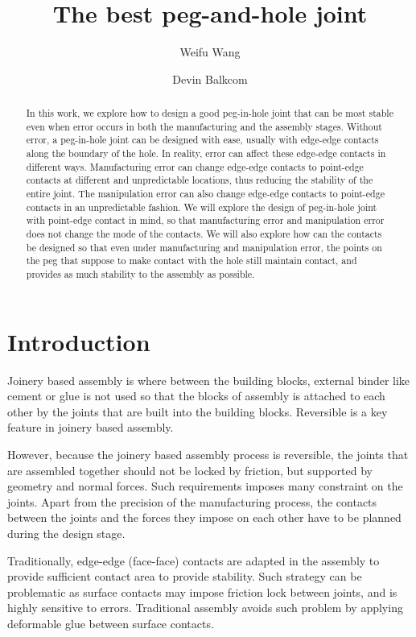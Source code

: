 \documentclass[11pt, twocolumn]{article}
\title{The best peg-and-hole joint}
\author{Weifu Wang \and Devin Balkcom}
\begin{document}
\maketitle

\begin{abstract}
In this work, we explore how to design a good peg-in-hole joint that can be most stable even when error occurs in both the manufacturing and the assembly stages. Without error, a peg-in-hole joint can be designed with ease, usually with edge-edge contacts along the boundary of the hole. In reality, error can affect these edge-edge contacts in different ways. Manufacturing error can change edge-edge contacts to point-edge contacts at different and unpredictable locations, thus reducing the stability of the entire joint. The manipulation error can also change edge-edge contacts to point-edge contacts in an unpredictable fashion. We will explore the design of peg-in-hole joint with point-edge contact in mind, so that manufacturing error and manipulation error does not change the mode of the contacts. We will also explore how can the contacts be designed so that even under manufacturing and manipulation error, the points on the peg that suppose to make contact with the hole still maintain contact, and provides as much stability to the assembly as possible. 
\end{abstract}

\section{Introduction}

Joinery based assembly is where between the building blocks, external binder like cement or glue is not used so that the blocks of assembly is attached to each other by the joints that are built into the building blocks. Reversible is a key feature in joinery based assembly. 

However, because the joinery based assembly process is reversible, the joints that are assembled together should not be locked by friction, but supported by geometry and normal forces. Such requirements imposes many constraint on the joints. Apart from the precision of the manufacturing process, the contacts between the joints and the forces they impose on each other have to be planned during the design stage. 

Traditionally, edge-edge (face-face) contacts are adapted in the assembly to provide sufficient contact area to provide stability. Such strategy can be problematic as surface contacts may impose friction lock between joints, and is highly sensitive to errors. Traditional assembly avoids such problem by applying deformable glue between surface contacts. 
\end{document}
